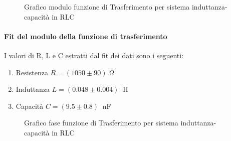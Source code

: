 \documentclass[letterpaper,12pt]{article}
\begin{document}
\begin{figure}[h!]
    \centering
    \caption{Grafico modulo funzione di Trasferimento per sistema induttanza-capacità in RLC}
    \label{fig:RLC_LC_modulo}
\end{figure}

\paragraph{Fit del modulo della funzione di trasferimento}
I valori di R, L e C estratti dal fit dei dati sono i seguenti:

\begin{enumerate}
    \item Resistenza $R = (1050 \pm 90)\ \Omega$
    \item Induttanza $L = (0.048 \pm 0.004)\ $ H
    \item Capacità $C = (9.5 \pm 0.8)\ $ nF
\end{enumerate}

\begin{figure}[h!]
    \centering
    \caption{Grafico fase funzione di Trasferimento per sistema induttanza-capacità in RLC}
    \label{fig:RLC_LC_fase}
\end{figure}
\end{document}
